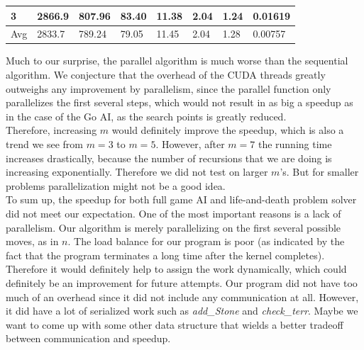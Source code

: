 \documentclass[11pt]{article}
\begin{document}
\begin{table}[H]
\begin{tabular}{|l|l|l|l|l|l|l|l|}
3                          & 2866.9                            & 807.96                            & 83.40                            & 11.38                             & 2.04                              & 1.24                             & 0.01619                                                                        \\ \hline
Avg                        & 2833.7                            & 789.24                            & 79.05                            & 11.45                             & 2.04                              & 1.28                             & 0.00757                                                                        \\ \hline
\end{tabular}
\end{table}
Much to our surprise, the parallel algorithm is much worse than the sequential algorithm. We conjecture that the overhead of the CUDA threads greatly outweighs any improvement by parallelism, since the parallel function only parallelizes the first several steps, which would not result in as big a speedup as in the case of the Go AI, as the search points is greatly reduced.\\
Therefore, increasing $m$ would definitely improve the speedup, which is also a trend we see from $m = 3$ to $m = 5$. However, after $m = 7$ the running time increases drastically, because the number of recursions that we are doing is increasing exponentially. Therefore we did not test on larger $m$'s. But for smaller problems parallelization might not be a good idea.\\
To sum up, the speedup for both full game AI and life-and-death problem solver did not meet our expectation. One of the most important reasons is a lack of parallelism. Our algorithm is merely parallelizing on the first several possible moves, as in $n$. The load balance for our program is poor (as indicated by the fact that the program terminates a long time after the kernel completes). Therefore it would definitely help to assign the work dynamically, which could definitely be an improvement for future attempts. Our program did not have too much of an overhead since it did not include any communication at all. However, it did have a lot of serialized work such as \textit{add\_Stone} and \textit{check\_terr}. Maybe we want to come up with some other data structure that wields a better tradeoff between communication and speedup. \\
\\
\end{document}
